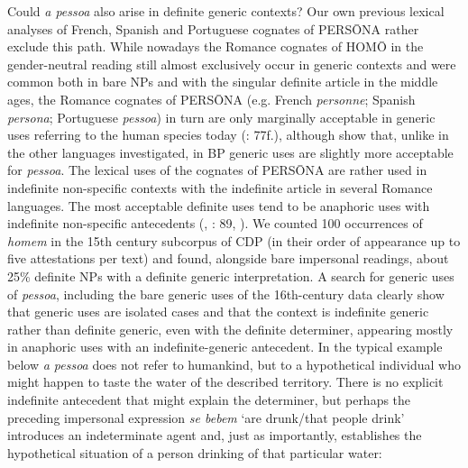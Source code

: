 \documentclass[output=paper]{langscibook}
\begin{document}
{Could} {\textit{a pessoa} }{also arise in definite generic contexts? Our own previous lexical analyses of French, Spanish and Portuguese cognates of PERSŌNA rather exclude this path. While nowadays the Romance cognates of HOMŌ in the gender{}-neutral reading still almost exclusively occur in generic contexts and were common both in bare NPs and with the singular definite article in the middle ages, the Romance cognates of PERSŌNA (e.g. French} {\textit{personne}}{; Spanish} {\textit{persona}}{; Portuguese} {\textit{pessoa}}{) in turn are only marginally acceptable in generic uses referring to the human species today (\citealt{Mihatsch2017}: 77f.), although \citet{AmaralMihatsch2016} show that, unlike in the} {other languages investigated, in BP generic uses are slightly more acceptable for} {\textit{pessoa}}{. The lexical uses of the cognates of PERSŌNA are rather used in indefinite non-specific contexts with the indefinite article in several Romance languages. The most acceptable definite uses tend to be anaphoric uses with indefinite non-specific antecedents (\citealt{AmaralMihatsch2016}, \citealt{Mihatsch2017}: 89, \citealt{AmaralMihatsch2019}). We counted 100 occurrences of} {\textit{homem} }{in the 15th century subcorpus of CDP (in their order of appearance up to five attestations per text) and found, alongside bare impersonal readings, about 25\% definite NPs with a definite generic interpretation. A search for generic uses of} {\textit{pessoa}}{, including the bare generic uses of the 16th{}-century data clearly show that generic uses are isolated cases and that the context is indefinite generic rather than definite generic, even with the definite determiner, appearing mostly in anaphoric uses with an indefinite{}-generic antecedent. In the typical example  below} {\textit{a pessoa}} {does not refer to humankind, but to a hypothetical individual who might happen to taste the water of the described territory. There is no explicit indefinite antecedent that might explain the determiner, but perhaps the preceding impersonal expression} {\textit{se bebem}} {‘are drunk/that people drink’ introduces an indeterminate agent and, just as importantly, establishes the hypothetical situation of a person drinking of that particular water:}
\end{document}
